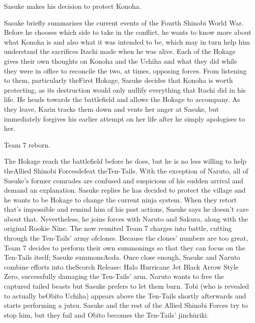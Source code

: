 \documentclass[a4paper,12pt]{article}
\begin{document}
Sasuke makes his decision to protect Konoha.\\ \par \vspace{0.5cm}

Sasuke briefly summarises the current events of the Fourth Shinobi World War. Before he chooses which side to take in the conflict, he wants to know more about what Konoha is and also what it was intended to be, which may in turn help him understand the sacrifices Itachi made when he was alive. Each of the Hokage gives their own thoughts on Konoha and the Uchiha and what they did while they were in office to reconcile the two, at times, opposing forces. From listening to them, particularly theFirst Hokage, Sasuke decides that Konoha is worth protecting, as its destruction would only nullify everything that Itachi did in his life. He heads towards the battlefield and allows the Hokage to accompany. As they leave, Karin tracks them down and vents her anger at Sasuke, but immediately forgives his earlier attempt on her life after he simply apologises to her.\\ \par \vspace{0.5cm}

Team 7 reborn.\\ \par \vspace{0.5cm}

The Hokage reach the battlefield before he does, but he is no less willing to help theAllied Shinobi Forcesdefeat theTen-Tails. With the exception of Naruto, all of Sasuke's former comrades are confused and suspicious of his sudden arrival and demand an explanation. Sasuke replies he has decided to protect the village and he wants to be Hokage to change the current ninja system. When they retort that's impossible and remind him of his past actions, Sasuke says he doesn't care about that. Nevertheless, he joins forces with Naruto and Sakura, along with the original Rookie Nine. The now reunited Team 7 charges into battle, cutting through the Ten-Tails' army ofclones. Because the clones' numbers are too great, Team 7 decides to perform their own summonings so that they can focus on the Ten-Tails itself; Sasuke summonsAoda. Once close enough, Sasuke and Naruto combine efforts into theScorch Release: Halo Hurricane Jet Black Arrow Style Zero, successfully damaging the Ten-Tails' arm. Naruto wants to free the captured tailed beasts but Sasuke prefers to let them burn. Tobi (who is revealed to actually beObito Uchiha) appears above the Ten-Tails shortly afterwards and starts performing a jutsu. Sasuke and the rest of the Allied Shinobi Forces try to stop him, but they fail and Obito becomes the Ten-Tails' jinchūriki.\\ \par \vspace{0.5cm}
\end{document}
